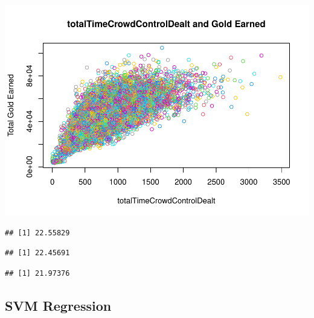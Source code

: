 \documentclass[
]{article}
\newenvironment{Shaded}{\begin{snugshade}}{\end{snugshade}}
\newcommand{\FunctionTok}[1]{\textcolor[rgb]{0.00,0.00,0.00}{#1}}
\newcommand{\NormalTok}[1]{#1}
\newcommand{\SpecialCharTok}[1]{\textcolor[rgb]{0.00,0.00,0.00}{#1}}
\begin{document}
\includegraphics{Regression_files/figure-latex/unnamed-chunk-5-9.pdf}

\begin{Shaded}
\end{Shaded}

\begin{verbatim}
## [1] 22.55829
\end{verbatim}

\begin{Shaded}
\end{Shaded}

\begin{verbatim}
## [1] 22.45691
\end{verbatim}

\begin{Shaded}
\end{Shaded}

\begin{verbatim}
## [1] 21.97376
\end{verbatim}

\hypertarget{svm-regression}{%
\subsection{SVM Regression}\label{svm-regression}}
\end{document}
